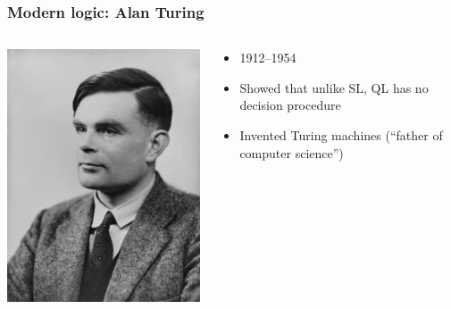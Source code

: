 \begin{frame}
  \frametitle{Modern logic: Alan Turing}

  \begin{columns}
    \begin{column}{.5\textwidth}
      \includegraphics[height=.8\textheight]{../assets/turing}
    \end{column}
    \begin{column}{.5\textwidth}
      \begin{itemize}[<+->]
        \item 1912--1954
        \item Showed that unlike SL, QL has no decision procedure
        \item Invented Turing machines (``father of computer science'')
      \end{itemize}
    \end{column}
  \end{columns}
\end{frame}

